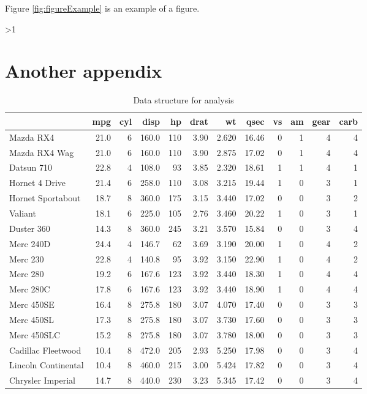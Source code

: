 \documentclass[
  11pt,
  american,
  letterpaper,
  ]{article}
\newcommand{\anappendix}[1]{
    \ifnum \value{section}>1
      \clearpage
      \pagebreak
      \setcounter{page}{1}
    \fi
      \pagenumbering{arabic}%
              \renewcommand{\thepage}{\thesection--\arabic{page}}%
          \section{#1} \label{Appendix \thesection}%
  }
\begin{document}
Figure \ref{fig:figureExample} is an example of a figure.

\newpage
\anappendix{Another appendix}

\begin{table}

\caption{\label{tab:xtable-example}Data structure for analysis}
\centering
\begin{tabular}[t]{l|r|r|r|r|r|r|r|r|r|r|r}
\hline
  & mpg & cyl & disp & hp & drat & wt & qsec & vs & am & gear & carb\\
\hline
Mazda RX4 & 21.0 & 6 & 160.0 & 110 & 3.90 & 2.620 & 16.46 & 0 & 1 & 4 & 4\\
\hline
Mazda RX4 Wag & 21.0 & 6 & 160.0 & 110 & 3.90 & 2.875 & 17.02 & 0 & 1 & 4 & 4\\
\hline
Datsun 710 & 22.8 & 4 & 108.0 & 93 & 3.85 & 2.320 & 18.61 & 1 & 1 & 4 & 1\\
\hline
Hornet 4 Drive & 21.4 & 6 & 258.0 & 110 & 3.08 & 3.215 & 19.44 & 1 & 0 & 3 & 1\\
\hline
Hornet Sportabout & 18.7 & 8 & 360.0 & 175 & 3.15 & 3.440 & 17.02 & 0 & 0 & 3 & 2\\
\hline
Valiant & 18.1 & 6 & 225.0 & 105 & 2.76 & 3.460 & 20.22 & 1 & 0 & 3 & 1\\
\hline
Duster 360 & 14.3 & 8 & 360.0 & 245 & 3.21 & 3.570 & 15.84 & 0 & 0 & 3 & 4\\
\hline
Merc 240D & 24.4 & 4 & 146.7 & 62 & 3.69 & 3.190 & 20.00 & 1 & 0 & 4 & 2\\
\hline
Merc 230 & 22.8 & 4 & 140.8 & 95 & 3.92 & 3.150 & 22.90 & 1 & 0 & 4 & 2\\
\hline
Merc 280 & 19.2 & 6 & 167.6 & 123 & 3.92 & 3.440 & 18.30 & 1 & 0 & 4 & 4\\
\hline
Merc 280C & 17.8 & 6 & 167.6 & 123 & 3.92 & 3.440 & 18.90 & 1 & 0 & 4 & 4\\
\hline
Merc 450SE & 16.4 & 8 & 275.8 & 180 & 3.07 & 4.070 & 17.40 & 0 & 0 & 3 & 3\\
\hline
Merc 450SL & 17.3 & 8 & 275.8 & 180 & 3.07 & 3.730 & 17.60 & 0 & 0 & 3 & 3\\
\hline
Merc 450SLC & 15.2 & 8 & 275.8 & 180 & 3.07 & 3.780 & 18.00 & 0 & 0 & 3 & 3\\
\hline
Cadillac Fleetwood & 10.4 & 8 & 472.0 & 205 & 2.93 & 5.250 & 17.98 & 0 & 0 & 3 & 4\\
\hline
Lincoln Continental & 10.4 & 8 & 460.0 & 215 & 3.00 & 5.424 & 17.82 & 0 & 0 & 3 & 4\\
\hline
Chrysler Imperial & 14.7 & 8 & 440.0 & 230 & 3.23 & 5.345 & 17.42 & 0 & 0 & 3 & 4\\

\end{tabular}
\end{table}
\end{document}
